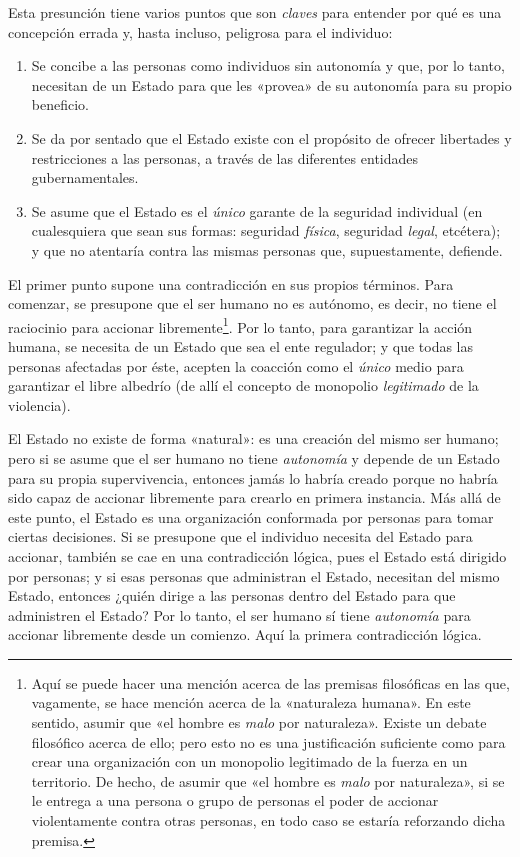 \documentclass[12pt,a4paper,twoside]{book}
\begin{document}
Esta presunción tiene varios puntos que son \textit{claves} para entender por qué es una concepción errada y, hasta incluso, peligrosa para el individuo:

\begin{enumerate}
\item Se concibe a las personas como individuos sin autonomía y que, por lo tanto, necesitan de un Estado para que les «provea» de su autonomía para su propio beneficio.
\item Se da por sentado que el Estado existe con el propósito de ofrecer libertades y restricciones a las personas, a través de las diferentes entidades gubernamentales.
\item Se asume que el Estado es el \textit{único} garante de la seguridad individual (en cualesquiera que sean sus formas: seguridad \textit{física}, seguridad \textit{legal}, etcétera); y que no atentaría contra las mismas personas que, supuestamente, defiende.
\end{enumerate}

El primer punto supone una contradicción en sus propios términos. Para comenzar, se presupone que el ser humano no es autónomo, es decir, no tiene el raciocinio para accionar libremente\footnote{Aquí se puede hacer una mención acerca de las premisas filosóficas en las que, vagamente, se hace mención acerca de la «naturaleza humana». En este sentido, asumir que «el hombre es \textit{malo} por naturaleza». Existe un debate filosófico acerca de ello; pero esto no es una justificación suficiente como para crear una organización con un monopolio legitimado de la fuerza en un territorio. De hecho, de asumir que «el hombre es \textit{malo} por naturaleza», si se le entrega a una persona o grupo de personas el poder de accionar violentamente contra otras personas, en todo caso se estaría reforzando dicha premisa.}. Por lo tanto, para garantizar la acción humana, se necesita de un Estado que sea el ente regulador; y que todas las personas afectadas por éste, acepten la coacción como el \textit{único} medio para garantizar el libre albedrío (de allí el concepto de monopolio \textit{legitimado} de la violencia).

El Estado no existe de forma «natural»: es una creación del mismo ser humano; pero si se asume que el ser humano no tiene \textit{autonomía} y depende de un Estado para su propia supervivencia, entonces jamás lo habría creado porque no habría sido capaz de accionar libremente para crearlo en primera instancia. Más allá de este punto, el Estado es una organización conformada por personas para tomar ciertas decisiones. Si se presupone que el individuo necesita del Estado para accionar, también se cae en una contradicción lógica, pues el Estado está dirigido por personas; y si esas personas que administran el Estado, necesitan del mismo Estado, entonces ¿quién dirige a las personas dentro del Estado para que administren el Estado? Por lo tanto, el ser humano sí tiene \textit{autonomía} para accionar libremente desde un comienzo. Aquí la primera contradicción lógica.
\end{document}
